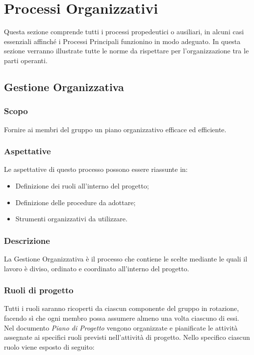 \section{Processi Organizzativi}
	Questa sezione comprende tutti i processi propedeutici o ausiliari, in alcuni casi essenziali affinché i Processi Principali funzionino in modo adeguato. In questa sezione verranno illustrate tutte le norme da rispettare per l'organizzazione tra le parti operanti.

	\subsection{Gestione Organizzativa}
	
		\subsubsection{Scopo}
			 Fornire ai membri del gruppo un piano organizzativo efficace ed efficiente.
			 
		\subsubsection{Aspettative}
			Le aspettative di questo processo possono essere riassunte in:
			\begin{itemize}
				\item Definizione dei ruoli all'interno del progetto;
				\item Definizione delle procedure da adottare;
				\item Strumenti organizzativi da utilizzare.
			\end{itemize}
		
		\subsubsection{Descrizione}
			La Gestione Organizzativa è il processo che contiene le scelte mediante le quali il lavoro è diviso, ordinato e coordinato all'interno del progetto.
			
		
		\subsubsection{Ruoli di progetto}
			Tutti i ruoli saranno ricoperti da ciascun componente del gruppo in rotazione, facendo sì che ogni membro possa assumere almeno una volta ciascuno di essi. Nel documento {\it Piano di Progetto} vengono organizzate e pianificate le attività assegnate ai specifici ruoli previsti nell’attività di progetto. Nello specifico ciascun ruolo viene esposto di seguito:
			
